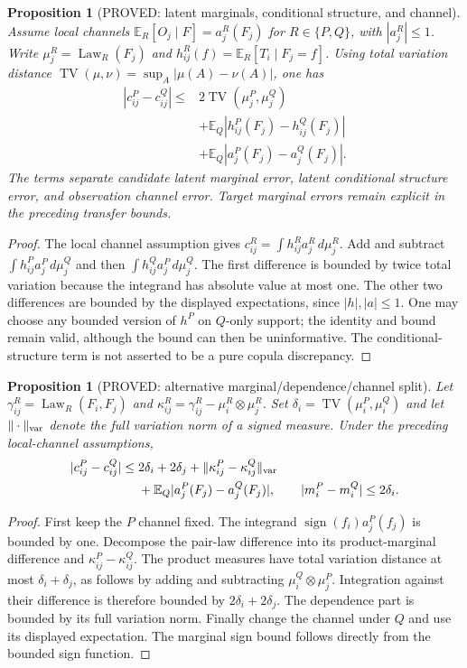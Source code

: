 \documentclass[11pt]{article}
\newtheorem{proposition}[theorem]{Proposition}
\theoremstyle{definition}
\theoremstyle{remark}
\begin{document}
\begin{proposition}[PROVED: latent marginals, conditional structure, and channel]
\label{prop:channel-split-r3}
Assume local channels
$\mathbb{E}_R[O_j\mid F]=a_j^R(F_j)$ for $R\in\{P,Q\}$,
with $|a_j^R|\le1$.
Write $\mu_j^R=\operatorname{Law}_R(F_j)$ and
$h_{ij}^R(f)=\mathbb{E}_R[T_i\mid F_j=f]$.
Using total variation distance
$\operatorname{TV}(\mu,\nu)=\sup_A|\mu(A)-\nu(A)|$, one has
\begin{align*}
 |c_{ij}^P-c_{ij}^Q|
 \le{}&2\operatorname{TV}(\mu_j^P,\mu_j^Q)\\
 &+\mathbb{E}_Q|h_{ij}^P(F_j)-h_{ij}^Q(F_j)|\\
 &+\mathbb{E}_Q|a_j^P(F_j)-a_j^Q(F_j)|.
\end{align*}
The terms separate candidate latent marginal error, latent conditional
structure error, and observation channel error. Target marginal errors
remain explicit in the preceding transfer bounds.
\end{proposition}
\begin{proof}
The local channel assumption gives
$c_{ij}^R=\int h_{ij}^R a_j^R\,d\mu_j^R$.
Add and subtract $\int h_{ij}^P a_j^P\,d\mu_j^Q$ and then
$\int h_{ij}^Q a_j^P\,d\mu_j^Q$.
The first difference is bounded by twice total variation because the
integrand has absolute value at most one. The other two differences are
bounded by the displayed expectations, since $|h|,|a|\le1$.
One may choose any bounded version of $h^P$ on $Q$-only support;
the identity and bound remain valid, although the bound can then be
uninformative. The conditional-structure term is not asserted to be a
pure copula discrepancy.
\end{proof}

\begin{proposition}[PROVED: alternative marginal/dependence/channel split]
Let $\gamma_{ij}^R=\operatorname{Law}_R(F_i,F_j)$ and
$\kappa_{ij}^R=\gamma_{ij}^R-\mu_i^R\otimes\mu_j^R$.
Set $\delta_i=\operatorname{TV}(\mu_i^P,\mu_i^Q)$ and let
$\|\cdot\|_{\rm var}$ denote the full variation norm of a signed measure.
Under the preceding local-channel assumptions,
\begin{align*}
 |c_{ij}^P-c_{ij}^Q|
 \le{}&2\delta_i+2\delta_j+
       \|\kappa_{ij}^P-\kappa_{ij}^Q\|_{\rm var}\\
 &+\mathbb{E}_Q|a_j^P(F_j)-a_j^Q(F_j)|,
 \qquad |m_i^P-m_i^Q|\le2\delta_i.
\end{align*}
\end{proposition}
\begin{proof}
First keep the $P$ channel fixed. The integrand
$\operatorname{sign}(f_i)a_j^P(f_j)$ is bounded by one.
Decompose the pair-law difference into its product-marginal difference
and $\kappa_{ij}^P-\kappa_{ij}^Q$.
The product measures have total variation distance at most
$\delta_i+\delta_j$, as follows by adding and subtracting
$\mu_i^Q\otimes\mu_j^P$. Integration against their difference is
therefore bounded by $2\delta_i+2\delta_j$.
The dependence part is bounded by its full variation norm.
Finally change the channel under $Q$ and use its displayed expectation.
The marginal sign bound follows directly from the bounded sign function.
\end{proof}
\end{document}
